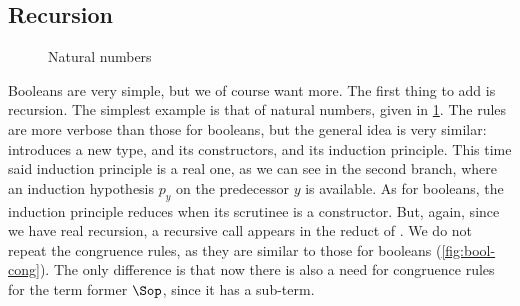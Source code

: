 \subsection{Recursion}

\begin{figure}[h]
  \AP
  \caption{Natural numbers}
  \label{fig:nat}
\end{figure}

Booleans are very simple, but we of course want more. The first thing to add is recursion.
The simplest example is that of natural numbers, given in \cref{fig:nat}.
The rules are more verbose than those for booleans, but the general idea is very similar:
 introduces a new type, 
and  its constructors, and  its induction
principle. This time said induction principle is a real one, as we can see in
the second branch, where an induction hypothesis $p_{y}$ on the predecessor $y$ is available.
As for booleans, the induction principle reduces when its scrutinee is a constructor.
But, again, since we have real recursion,
a recursive call appears in the reduct of .
We do not repeat the congruence rules, as they are similar to those for booleans
(\cref{fig:bool-cong}). The only difference is that now there is also a need for congruence
rules for the term former $\Sop$, since it has a sub-term.


